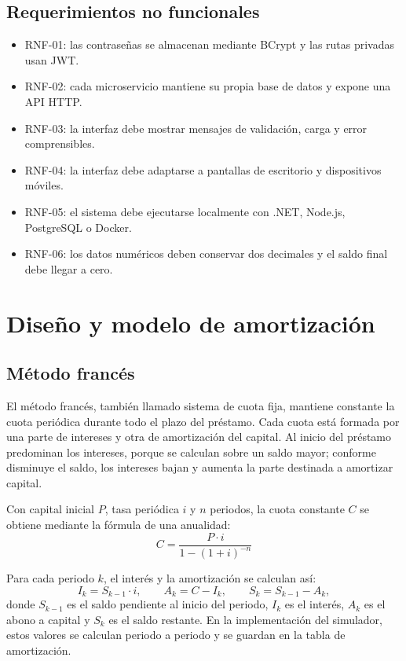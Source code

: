 \documentclass[12pt,a4paper]{article}
\begin{document}
\subsection{Requerimientos no funcionales}

\begin{itemize}[leftmargin=*]
    \item RNF-01: las contraseñas se almacenan mediante BCrypt y las rutas privadas usan JWT.
    \item RNF-02: cada microservicio mantiene su propia base de datos y expone una API HTTP.
    \item RNF-03: la interfaz debe mostrar mensajes de validación, carga y error comprensibles.
    \item RNF-04: la interfaz debe adaptarse a pantallas de escritorio y dispositivos móviles.
    \item RNF-05: el sistema debe ejecutarse localmente con .NET, Node.js, PostgreSQL o Docker.
    \item RNF-06: los datos numéricos deben conservar dos decimales y el saldo final debe llegar a cero.
\end{itemize}

\section{Diseño y modelo de amortización}

\subsection{Método francés}

El método francés, también llamado sistema de cuota fija, mantiene constante la
cuota periódica durante todo el plazo del préstamo. Cada cuota está formada por
una parte de intereses y otra de amortización del capital. Al inicio del
préstamo predominan los intereses, porque se calculan sobre un saldo mayor;
conforme disminuye el saldo, los intereses bajan y aumenta la parte destinada a
amortizar capital.

Con capital inicial $P$, tasa periódica $i$ y $n$ periodos, la cuota constante
$C$ se obtiene mediante la fórmula de una anualidad:
\[
C = \frac{P \cdot i}{1 - (1+i)^{-n}}
\]

Para cada periodo $k$, el interés y la amortización se calculan así:
\[
I_k = S_{k-1} \cdot i, \qquad
A_k = C - I_k, \qquad
S_k = S_{k-1} - A_k,
\]
donde $S_{k-1}$ es el saldo pendiente al inicio del periodo, $I_k$ es el
interés, $A_k$ es el abono a capital y $S_k$ es el saldo restante. En la
implementación del simulador, estos valores se calculan periodo a periodo y se
guardan en la tabla de amortización.
\end{document}
